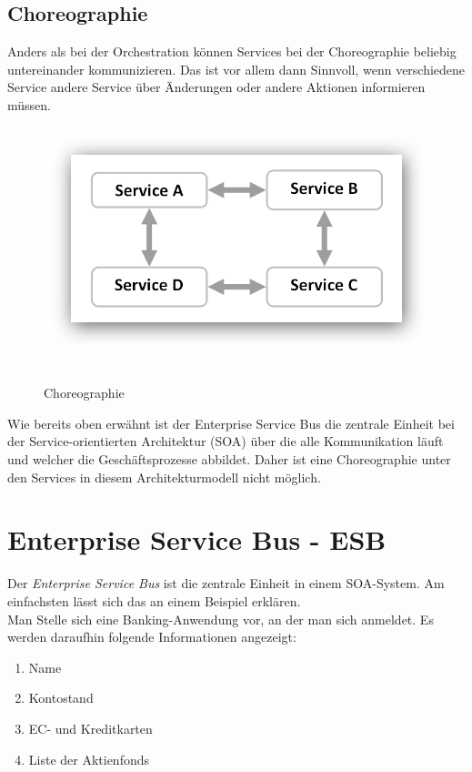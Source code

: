 \subsection{Choreographie}
\label{subsec:choreographie}
Anders als bei der Orchestration können Services bei der Choreographie beliebig untereinander kommunizieren. Das ist vor allem dann Sinnvoll, wenn verschiedene Service andere Service über Änderungen oder andere Aktionen informieren müssen.

\begin{figure}[htb]
    \centering 
    \includegraphics[width=\linewidth]{content/images/ServiceChoreography}\
    \caption[Choreographie]{Choreographie}
    \label{fig:ServiceOrchestration}  
\end{figure}

Wie bereits oben erwähnt ist der Enterprise Service Bus die zentrale Einheit bei der Service-orientierten Architektur (SOA) über die alle Kommunikation läuft und welcher die Geschäftsprozesse abbildet. Daher ist eine Choreographie unter den Services in diesem Architekturmodell nicht möglich.

\section{Enterprise Service Bus - ESB}
\label{sec:esb}
Der \textit{Enterprise Service Bus} ist die zentrale Einheit in einem SOA-System. Am einfachsten lässt sich das an einem Beispiel erklären.
\\
Man Stelle sich eine Banking-Anwendung vor, an der man sich anmeldet. Es werden daraufhin folgende Informationen angezeigt:

\begin{enumerate}
    \item Name
    \item Kontostand
    \item EC- und Kreditkarten
    \item Liste der Aktienfonds
\end{enumerate}

